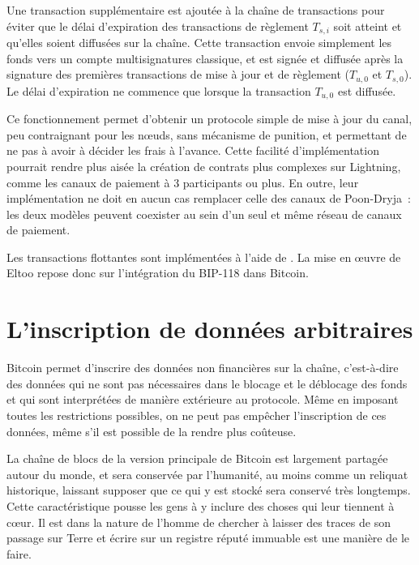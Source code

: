 Une transaction supplémentaire est ajoutée à la chaîne de transactions pour éviter que le délai d'expiration des transactions de règlement $T_{s,i}$ soit atteint et qu'elles soient diffusées sur la chaîne. Cette transaction envoie simplement les fonds vers un compte multisignatures classique, et est signée et diffusée après la signature des premières transactions de mise à jour et de règlement ($T_{u,0}$ et $T_{s,0}$). Le délai d'expiration ne commence que lorsque la transaction $T_{u,0}$ est diffusée.

Ce fonctionnement permet d'obtenir un protocole simple de mise à jour du canal, peu contraignant pour les nœuds, sans mécanisme de punition, et permettant de ne pas à avoir à décider les frais à l'avance. Cette facilité d'implémentation pourrait rendre plus aisée la création de contrats plus complexes sur Lightning, comme les canaux de paiement à 3 participants ou plus. En outre, leur implémentation ne doit en aucun cas remplacer celle des canaux de Poon-Dryja~: les deux modèles peuvent coexister au sein d'un seul et même réseau de canaux de paiement.

Les transactions flottantes sont implémentées à l'aide de . La mise en œuvre de Eltoo repose donc sur l'intégration du BIP-118 dans Bitcoin.

\section*{L'inscription de données arbitraires}

Bitcoin permet d'inscrire des données non financières sur la chaîne, c'est-à-dire des données qui ne sont pas nécessaires dans le blocage et le déblocage des fonds et qui sont interprétées de manière extérieure au protocole. Même en imposant toutes les restrictions possibles, on ne peut pas empêcher l'inscription de ces données, même s'il est possible de la rendre plus coûteuse.

La chaîne de blocs de la version principale de Bitcoin est largement partagée autour du monde, et sera conservée par l'humanité, au moins comme un reliquat historique, laissant supposer que ce qui y est stocké sera conservé très longtemps. Cette caractéristique pousse les gens à y inclure des choses qui leur tiennent à cœur. Il est dans la nature de l'homme de chercher à laisser des traces de son passage sur Terre et écrire sur un registre réputé immuable est une manière de le faire.

